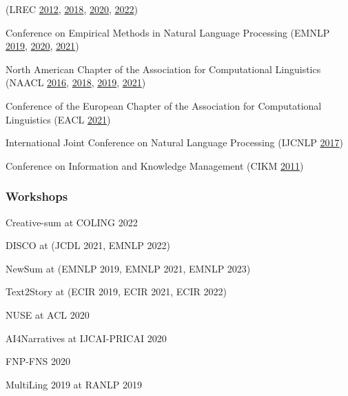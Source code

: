 \begin{itemize*}[label={},
                 itemjoin={{,\space}},
                 afterlabel={},
                 after={{.}}]
    \item 
    (LREC 
    \href{https://aclanthology.org/volumes/L12-1/}{2012},
    \href{https://aclanthology.org/L18-1000/}{2018},
    \href{https://aclanthology.org/2020.lrec-1.0.pdf}{2020},
    \href{https://lrec2022.lrec-conf.org/en/committees/scientific-committee/}{2022})
    
    \item Conference on Empirical Methods in Natural Language Processing
    (EMNLP
    \href{https://aclanthology.org/D19-1000.pdf}{2019},
    \href{https://aclanthology.org/2020.emnlp-main.0.pdf}{2020},
    \href{https://aclanthology.org/2021.emnlp-main.0.pdf}{2021})

    \item North American Chapter of the Association for Computational Linguistics 
    (NAACL
    \href{https://aclanthology.org/N16-1000.pdf}{2016},
    \href{https://aclanthology.org/N18-1000.pdf}{2018},
    \href{https://aclanthology.org/N19-1000.pdf}{2019},
    \href{https://aclanthology.org/2021.naacl-main.0.pdf}{2021})

    \item Conference of the European Chapter of the Association for Computational Linguistics
    (EACL 
    \href{https://aclanthology.org/2021.eacl-main.0.pdf}{2021})
    
    \item International Joint Conference on Natural Language Processing
    (IJCNLP 
    \href{https://aclanthology.org/I17-1000.pdf}{2017})

    \item Conference on Information and Knowledge Management
    (CIKM 
    \href{https://dl.acm.org/action/showFmPdf?doi=10.1145%2F2063576}{2011})

    

\end{itemize*}

\subsubsection*{Workshops}

\begin{itemize*}[label={},
                 itemjoin={{,\space}},
                 afterlabel={},
                 after={{.}}]
  
    \item Creative-sum at COLING 2022
    \item DISCO at (JCDL 2021, EMNLP 2022)
    \item NewSum at (EMNLP 2019, EMNLP 2021, EMNLP 2023)
    \item Text2Story at (ECIR 2019, ECIR 2021, ECIR 2022)
    \item NUSE at ACL 2020
    \item AI4Narratives at IJCAI-PRICAI 2020
    \item FNP-FNS 2020
    \item MultiLing 2019 at RANLP 2019
\end{itemize*}

